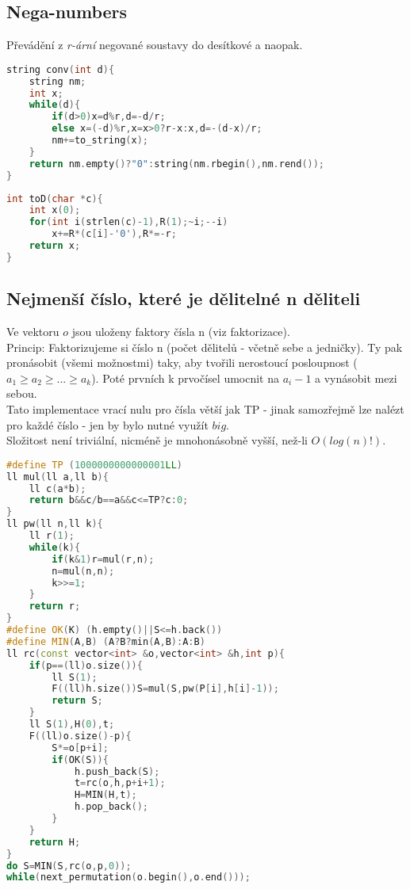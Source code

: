 \documentclass[11pt]{article}
\begin{document}
\subsection{Nega-numbers}
Převádění z \textit{r-ární} negované soustavy do desítkové a naopak.
\begin{lstlisting}[language=C++]
string conv(int d){
    string nm;
    int x;
    while(d){
        if(d>0)x=d%r,d=-d/r;
        else x=(-d)%r,x=x>0?r-x:x,d=-(d-x)/r;
        nm+=to_string(x);
    }
    return nm.empty()?"0":string(nm.rbegin(),nm.rend());
}
\end{lstlisting}
\begin{lstlisting}[language=C++]
int toD(char *c){
    int x(0);
    for(int i(strlen(c)-1),R(1);~i;--i)
        x+=R*(c[i]-'0'),R*=-r;
    return x;
}
\end{lstlisting}
\subsection{Nejmenší číslo, které je dělitelné n děliteli}
Ve vektoru $o$ jsou uloženy faktory čísla \textsf{n} (viz faktorizace).
\\Princip: Faktorizujeme si číslo \textsf{n} (počet dělitelů - včetně sebe a jedničky). Ty pak pronásobit (všemi možnostmi) taky, aby tvořili nerostoucí posloupnost ($a_1\geq a_2 \geq ... \geq a_k$). Poté prvních \textsf{k} prvočísel umocnit na $a_i-1$ a vynásobit mezi sebou.
\\Tato implementace vrací nulu pro čísla větší jak \textsf{TP} - jinak samozřejmě lze nalézt pro každé číslo - jen by bylo nutné využít $big$.
\\Složitost není triviální, nicméně je mnohonásobně vyšší, než-li $O(log(n)!)$.
\begin{lstlisting}[language=C++]
#define TP (1000000000000001LL)
ll mul(ll a,ll b){
    ll c(a*b);
    return b&&c/b==a&&c<=TP?c:0;
}
ll pw(ll n,ll k){
    ll r(1);
    while(k){
        if(k&1)r=mul(r,n);
        n=mul(n,n);
        k>>=1;
    }
    return r;
}
#define OK(K) (h.empty()||S<=h.back())
#define MIN(A,B) (A?B?min(A,B):A:B)
ll rc(const vector<int> &o,vector<int> &h,int p){
    if(p==(ll)o.size()){
        ll S(1);
        F((ll)h.size())S=mul(S,pw(P[i],h[i]-1));
        return S;
    }
    ll S(1),H(0),t;
    F((ll)o.size()-p){
        S*=o[p+i];
        if(OK(S)){
            h.push_back(S);
            t=rc(o,h,p+i+1);
            H=MIN(H,t);
            h.pop_back();
        }
    }
    return H;
}
do S=MIN(S,rc(o,p,0));
while(next_permutation(o.begin(),o.end()));
\end{lstlisting}
\end{document}
